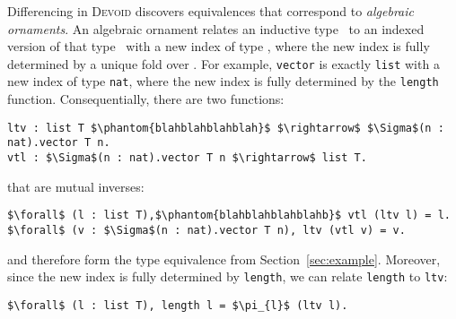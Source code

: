 Differencing in \textsc{Devoid} discovers equivalences that correspond to \textit{algebraic ornaments}.
An algebraic ornament relates an inductive type \Aa\ to an indexed version of that type \B\ with a new index of type \IB,
where the new index is fully determined by a unique fold over \Aa. 
For example, \lstinline{vector} is exactly \lstinline{list} with a new index of type \lstinline{nat},
where the new index is fully determined by the \lstinline{length} function. Consequentially, there are two functions:
\begin{lstlisting}
ltv : list T $\phantom{blahblahblahblah}$ $\rightarrow$ $\Sigma$(n : nat).vector T n.
vtl : $\Sigma$(n : nat).vector T n $\rightarrow$ list T.
\end{lstlisting}
that are mutual inverses:
\begin{lstlisting}
$\forall$ (l : list T),$\phantom{blahblahblahblahb}$ vtl (ltv l) = l.
$\forall$ (v : $\Sigma$(n : nat).vector T n), ltv (vtl v) = v.
\end{lstlisting}
and therefore form the type equivalence from Section~\ref{sec:example}.
Moreover, since the new index is fully determined by \lstinline{length}, we can relate \lstinline{length} to \lstinline{ltv}:
\begin{lstlisting}
$\forall$ (l : list T), length l = $\pi_{l}$ (ltv l).
\end{lstlisting}

